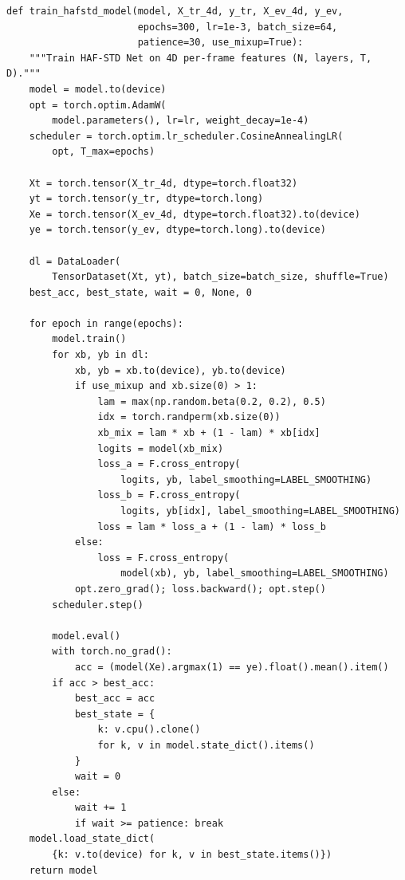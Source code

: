 \begin{lstlisting}[caption={4D Tensor Mixup and Training Harness for HAF-STD Net on HMDB51.}, label={lst:hafstd_train}]
def train_hafstd_model(model, X_tr_4d, y_tr, X_ev_4d, y_ev,
                       epochs=300, lr=1e-3, batch_size=64,
                       patience=30, use_mixup=True):
    """Train HAF-STD Net on 4D per-frame features (N, layers, T, D)."""
    model = model.to(device)
    opt = torch.optim.AdamW(
        model.parameters(), lr=lr, weight_decay=1e-4)
    scheduler = torch.optim.lr_scheduler.CosineAnnealingLR(
        opt, T_max=epochs)

    Xt = torch.tensor(X_tr_4d, dtype=torch.float32)
    yt = torch.tensor(y_tr, dtype=torch.long)
    Xe = torch.tensor(X_ev_4d, dtype=torch.float32).to(device)
    ye = torch.tensor(y_ev, dtype=torch.long).to(device)

    dl = DataLoader(
        TensorDataset(Xt, yt), batch_size=batch_size, shuffle=True)
    best_acc, best_state, wait = 0, None, 0

    for epoch in range(epochs):
        model.train()
        for xb, yb in dl:
            xb, yb = xb.to(device), yb.to(device)
            if use_mixup and xb.size(0) > 1:
                lam = max(np.random.beta(0.2, 0.2), 0.5)
                idx = torch.randperm(xb.size(0))
                xb_mix = lam * xb + (1 - lam) * xb[idx]
                logits = model(xb_mix)
                loss_a = F.cross_entropy(
                    logits, yb, label_smoothing=LABEL_SMOOTHING)
                loss_b = F.cross_entropy(
                    logits, yb[idx], label_smoothing=LABEL_SMOOTHING)
                loss = lam * loss_a + (1 - lam) * loss_b
            else:
                loss = F.cross_entropy(
                    model(xb), yb, label_smoothing=LABEL_SMOOTHING)
            opt.zero_grad(); loss.backward(); opt.step()
        scheduler.step()

        model.eval()
        with torch.no_grad():
            acc = (model(Xe).argmax(1) == ye).float().mean().item()
        if acc > best_acc:
            best_acc = acc
            best_state = {
                k: v.cpu().clone()
                for k, v in model.state_dict().items()
            }
            wait = 0
        else:
            wait += 1
            if wait >= patience: break
    model.load_state_dict(
        {k: v.to(device) for k, v in best_state.items()})
    return model
\end{lstlisting}
